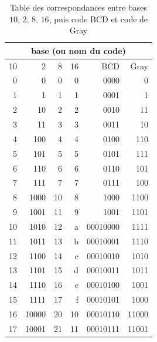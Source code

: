 \begin{table}
 \centering
  \begin{tabular}{ | r | r | r | r | r | r |}
    \hline
    \multicolumn{6}{|c|}{base (ou nom du code)} \\
    \hline
    10 & 2 & 8 & 16 & BCD & Gray \\ \hline \hline
   0 &     0 &     0 &     0 &  0000 &     0 \\ \hline
   1 &     1 &     1 &     1 &  0001 &     1 \\ \hline
   2 &    10 &     2 &     2 &  0010 &    11 \\ \hline
   3 &    11 &     3 &     3 &  0011 &    10 \\ \hline
   4 &   100 &     4 &     4 &  0100 &   110 \\ \hline
   5 &   101 &     5 &     5 &  0101 &   111 \\ \hline
   6 &   110 &     6 &     6 &  0110 &   101 \\ \hline
   7 &   111 &     7 &     7 &  0111 &   100 \\ \hline
   8 &  1000 &    10 &     8 &  1000 &  1100 \\ \hline
   9 &  1001 &    11 &     9 &  1001 &  1101 \\ \hline
  10 &  1010 &    12 &     a & 00010000 &  1111 \\ \hline
  11 &  1011 &    13 &     b & 00010001 &  1110 \\ \hline
  12 &  1100 &    14 &     c & 00010010 &  1010 \\ \hline
  13 &  1101 &    15 &     d & 00010011 &  1011 \\ \hline
  14 &  1110 &    16 &     e & 00010100 &  1001 \\ \hline
  15 &  1111 &    17 &     f & 00010101 &  1000 \\ \hline
  16 & 10000 &    20 &    10 & 00010110 & 11000 \\ \hline
  17 & 10001 &    21 &    11 & 00010111 & 11001 \\ \hline
  \end{tabular}
  \caption{Table des correspondances entre bases $10$, $2$, $8$, $16$, puis code BCD et code de Gray}
\end{table}

